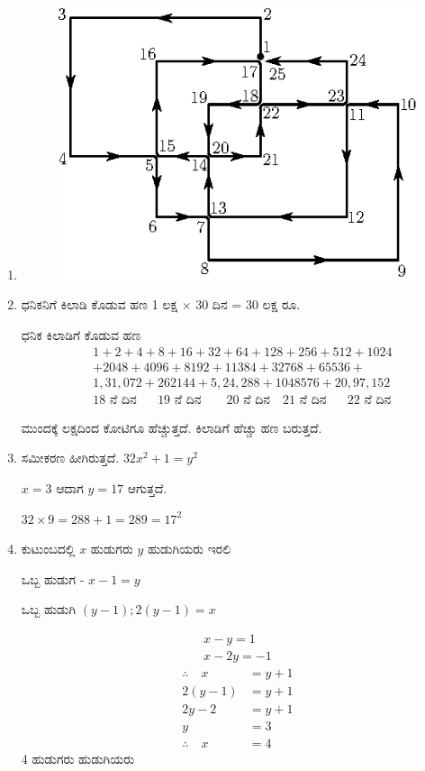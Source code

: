\begin{enumerate}
\item 
\begin{figure}[H]
\centering
\includegraphics{images/chap8/ans24.eps}
\end{figure}

\item ಧನಿಕನಿಗೆ ಕಿಲಾಡಿ ಕೊಡುವ ಹಣ 1 ಲಕ್ಷ $\times$ 30 ದಿನ  = 30 ಲಕ್ಷ ರೂ.

ಧನಿಕ ಕಿಲಾಡಿಗೆ ಕೊಡುವ ಹಣ 
\begin{align*}
& 1+2+4+8+16+32+64+128+256+512+1024\\
& +2048+4096+8192+11384+32768+65536+\\
& 1,31,072+262144+5,24,288+1048576+20,97,152\\
& {18 \text{ ನೆ ದಿನ}} ~~~\quad {19 \text{ ನೆ ದಿನ}}\qquad {20 \text{ ನೆ ದಿನ}}\quad{21 \text{ ನೆ ದಿನ}}~~~\quad{22 \text{ ನೆ ದಿನ}}
\end{align*}

ಮುಂದಕ್ಕೆ ಲಕ್ಷದಿಂದ ಕೋಟಿಗೂ ಹೆಚ್ಚುತ್ತದೆ. ಕಿಲಾಡಿಗೆ ಹೆಚ್ಚು ಹಣ ಬರುತ್ತದೆ. 

\item  ಸಮೀಕರಣ ಹೀಗಿರುತ್ತದೆ. $32x^{2} + 1 = y^{2}$

$x=3$ ಆದಾಗ $y=17$ ಆಗುತ್ತದೆ. 

$32\times 9 = 288 + 1 = 289 = 17^{2}$

\item ಕುಟುಂಬದಲ್ಲಿ $x$ ಹುಡುಗರು $y$ ಹುಡುಗಿಯರು ಇರಲಿ 

ಒಬ್ಬ ಹುಡುಗ - $x - 1 = y$

ಒಬ್ಬ ಹುಡುಗಿ $(y - 1); 2(y - 1) = x$

\begin{gather*}
x - y = 1\\
x - 2y = -1
\end{gather*}
\begin{align*}
\therefore\quad x & = y + 1\\
2(y - 1) & = y + 1\\
2y - 2 & = y + 1\\
y & = 3\\
\therefore\quad x & = 4
\end{align*}
4 ಹುಡುಗರು ಹುಡುಗಿಯರು 


\end{enumerate}
